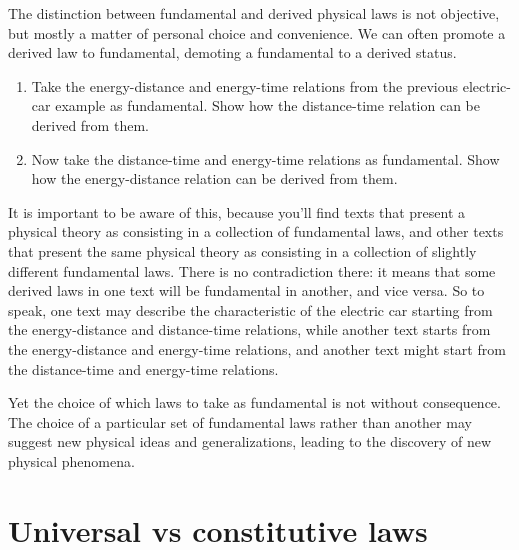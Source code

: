 \documentclass[a4paper,12pt,%
onecolumn,oneside,titlepage,%
british%
]{memoir}
\renewcommand*{\|}[1][]{\nonscript\:#1\vert\nonscript\:\mathopen{}}
\begin{document}
The distinction between fundamental and derived physical laws is not objective, but mostly a matter of personal choice and convenience. We can often promote a derived law to fundamental, demoting a fundamental to a derived status.
\begin{exercise}
  \begin{enumerate}[exerc]
  \item Take the energy-distance and energy-time relations from the previous electric-car example as fundamental. Show how the distance-time relation can be derived from them.
  \item Now take the distance-time and energy-time relations as fundamental. Show how the energy-distance relation can be derived from them.
  \end{enumerate}
\end{exercise}
It is important to be aware of this, because you'll find texts that present a physical theory as consisting in a collection of fundamental laws, and other texts that present the same physical theory as consisting in a collection of slightly different fundamental laws. There is no contradiction there: it means that some derived laws in one text will be fundamental in another, and vice versa. So to speak, one text may describe the characteristic of the electric car starting from the energy-distance and distance-time relations, while another text starts from the energy-distance and energy-time relations, and another text might start from the distance-time and energy-time relations.

Yet the choice of which laws to take as fundamental is not without consequence. The choice of a particular set of fundamental laws rather than another may suggest new physical ideas and generalizations, leading to the discovery of new physical phenomena.


\section{Universal vs constitutive laws}
\label{sec:universal_constitutive}
\end{document}
